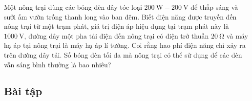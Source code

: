 \begin{vd}
Một nông trại dùng các bóng đèn dây tóc loại $\SI{200}{\watt}-\SI{200}{\volt}$ để thắp sáng và sưởi ấm vườn trồng thanh long vào ban đêm. Biết điện năng được truyền đến nông trại từ một trạm phát, giá trị điện áp hiệu dụng tại trạm phát này là $\SI{1000}{\volt}$, đường dây một pha tải điện đến nông trại có điện trở thuần $\SI{20}{\ohm}$ và máy hạ áp tại nông trại là máy hạ áp lí tưởng. Coi rằng hao phí điện năng chỉ xảy ra trên đường dây tải. Số bóng đèn tối đa mà nông trại có thể sử dụng để các đèn vẫn sáng bình thường là bao nhiêu?
\end{vd}
\subsection{Bài tập}
